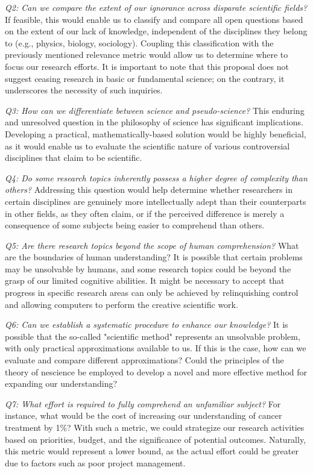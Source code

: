 \emph{Q2: Can we compare the extent of our ignorance across disparate scientific fields?} If feasible, this would enable us to classify and compare all open questions based on the extent of our lack of knowledge, independent of the disciplines they belong to (e.g., physics, biology, sociology). Coupling this classification with the previously mentioned relevance metric would allow us to determine where to focus our research efforts. It is important to note that this proposal does not suggest ceasing research in basic or fundamental science; on the contrary, it underscores the necessity of such inquiries.

\emph{Q3: How can we differentiate between science and pseudo-science?} This enduring and unresolved question in the philosophy of science has significant implications. Developing a practical, mathematically-based solution would be highly beneficial, as it would enable us to evaluate the scientific nature of various controversial disciplines that claim to be scientific.

\emph{Q4: Do some research topics inherently possess a higher degree of complexity than others?} Addressing this question would help determine whether researchers in certain disciplines are genuinely more intellectually adept than their counterparts in other fields, as they often claim, or if the perceived difference is merely a consequence of some subjects being easier to comprehend than others.

\emph{Q5: Are there research topics beyond the scope of human comprehension?} What are the boundaries of human understanding? It is possible that certain problems may be unsolvable by humans, and some research topics could be beyond the grasp of our limited cognitive abilities. It might be necessary to accept that progress in specific research areas can only be achieved by relinquishing control and allowing computers to perform the creative scientific work.

\emph{Q6: Can we establish a systematic procedure to enhance our knowledge?} It is possible that the so-called "scientific method" represents an unsolvable problem, with only practical approximations available to us. If this is the case, how can we evaluate and compare different approximations? Could the principles of the theory of nescience be employed to develop a novel and more effective method for expanding our understanding?

\emph{Q7: What effort is required to fully comprehend an unfamiliar subject?} For instance, what would be the cost of increasing our understanding of cancer treatment by 1\%? With such a metric, we could strategize our research activities based on priorities, budget, and the significance of potential outcomes. Naturally, this metric would represent a lower bound, as the actual effort could be greater due to factors such as poor project management.

